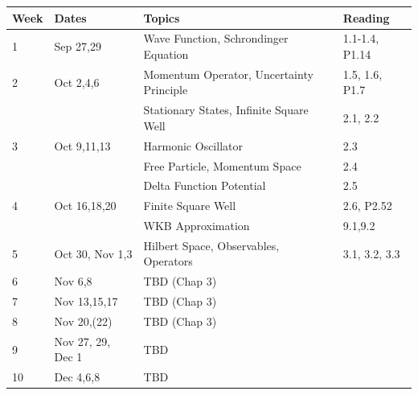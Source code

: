\documentclass[12pt]{article}
\begin{document}
\noindent
\begin{tabular}{llll}
\textbf{Week} & \textbf{Dates} & \textbf{Topics} & \textbf{Reading} \\
\hline
1  & Sep 27,29         & Wave Function, Schrondinger Equation & 1.1-1.4, P1.14 \\
\hline
2  & Oct 2,4,6         & Momentum Operator, Uncertainty Principle & 1.5, 1.6, P1.7 \\
   &                   & Stationary States, Infinite Square Well & 2.1, 2.2 \\
\hline
3  & Oct 9,11,13       & Harmonic Oscillator & 2.3 \\
   &                   & Free Particle, Momentum Space & 2.4 \\
   &                   & Delta Function Potential & 2.5 \\
\hline
4  & Oct 16,18,20      & Finite Square Well & 2.6, P2.52\\
   &                   & WKB Approximation & 9.1,9.2 \\
\hline
5  & Oct 30, Nov 1,3   & Hilbert Space, Observables, Operators & 3.1, 3.2, 3.3\\
\hline
6  & Nov 6,8           & TBD (Chap 3) \\
\hline
7  & Nov 13,15,17      & TBD (Chap 3) \\
8  & Nov 20,(22)       & TBD (Chap 3) \\
9  & Nov 27, 29, Dec 1 & TBD \\
10 & Dec 4,6,8         & TBD \\
\hline
\end{tabular}\\ \vskip 1cm
\end{document}
